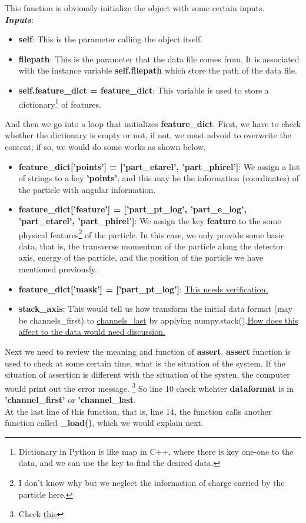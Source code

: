 \documentclass[12pt]{report}
\numberwithin{equation}{section}
\begin{document}
This function is obviously initialize the object with some certain inputs. \\
\textit{\textbf{Inputs}}: 
\begin{itemize}
    \item \textbf{self}: This is the parameter calling the object itself.
    \item \textbf{filepath}: This is the parameter that the data file comes from. 
    It is associated with the instance variable \textbf{self.filepath} which store the path of the data file.
    \item \textbf{self.feature\_dict = feature\_dict}: This variable is used to store a dictionary\footnote{Dictionary in Python is like map in C++, where there is key one-one to the data, and we can use the key to find the desired data.} of features. 
\end{itemize}

And then we go into a loop that initializes \textbf{feature\_dict}. First, we have to check whether the dictionary is empty or not, if not, we must advoid to overwrite the content; if so, we would do some works as shown below,
\begin{itemize}
    \item \textbf{feature\_dict['points'] = ['part\_etarel', 'part\_phirel']}: We assign a list of strings to a key \textbf{'points'}, and this may be the information (coordinates) of the particle with angular information.
    \item \textbf{feature\_dict['feature'] = ['part\_pt\_log', 'part\_e\_log', 'part\_etarel', 'part\_phirel']}:
    We assign the key \textbf{feature} to the some physical features\footnote{I don't know why but we neglect the information of charge carried by the particle here.} of the particle. In this case, we only provide some basic data, that is, the transverse momentum of the particle along the detector axis, energy of the particle, and the position of the particle we have mentioned previously. 
    \item \textbf{feature\_dict['mask'] = ['part\_pt\_log']}: \underline{This needs verification.}
    \item \textbf{stack\_axis}: This would tell us how transform the initial data format (may be channels\_first) to \hyperref[sec::channel]{channels\_last} by applying numpy.stack().\underline{How does this affect to the data would need discussion.} 
\end{itemize}

Next we need to review the meaning and function of \textbf{assert}. \textbf{assert} function is used to check at some certain time, what is the situation of the system. 
If the situation of assertion is different with the situation of the systen, the computer would print out the error message. \footnote{Check \hyperlink{https://openhome.cc/zh-tw/python/exception/assert/}{this}} 
So line 10 check whehter \textbf{dataformat} is in \textbf{'channel\_first'} or \textbf{'channel\_last}.
\\
\indent At the last line of this function, that is, line 14, the function calls another function called \textbf{\_load()}, which we would explain next.
\end{document}
